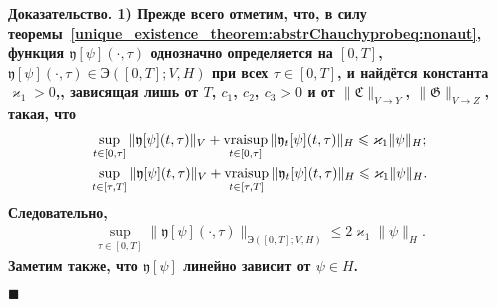 \documentclass{report}
\newcounter{rem}[section]
\newcounter{theor}[section]
\newenvironment{Proof}{\par\noindent\bf Доказательство.\rm}{ $\blacksquare$\par}
\newcommand{\vraisup}{\mathop{\rm vraisup}}
\begin{document}
\begin{Proof}
1) Прежде всего отметим, что, в силу теоремы~\ref{unique_existence_theorem:abstrChauchyprobeq:nonaut}, функция $\mathfrak{y}[\psi](\cdot,\tau)$ 
однозначно определяется на $[0,T]$, $\mathfrak{y}[\psi](\cdot,\tau)\in{\textrm{Э}}([0,T];V,H)$ при всех $\tau\in[0,T]$, и найдётся константа 
$\varkappa_1>0$,, зависящая лишь от $T$, $c_1$, $c_2$, $c_3>0$ и от $\|\mathfrak{C}\|_{V\to Y}$,  $\|\mathfrak{G}\|_{V\to Z}$, такая, что
\begin{gather*}
\sup\limits_{t\in[0,\tau]}\|\mathfrak{y}[\psi](t,\tau)\|_{V}+\vraisup\limits_{t\in[0,\tau]}\|\mathfrak{y}_t[\psi](t,\tau)\|_{H}\leqslant\varkappa_1\|\psi\|_H;\\
\sup\limits_{t\in[\tau,T]}\|\mathfrak{y}[\psi](t,\tau)\|_{V}+\vraisup\limits_{t\in[\tau,T]}\|\mathfrak{y}_t[\psi](t,\tau)\|_{H}\leqslant\varkappa_1\|\psi\|_H.
\end{gather*}
Следовательно,
\begin{gather}\label{abstrChauchyprobeq:nonaut:parametric:homogenious.eq!theorem.y.cont:auxiliary_a_priori_estimate}
\sup\limits_{\tau\in[0,T]}\|\mathfrak{y}[\psi](\cdot,\tau)\|_{\textrm{Э}([0,T];V,H)}\leqslant2\varkappa_1\|\psi\|_H.
\end{gather}
Заметим также, что $\mathfrak{y}[\psi]$ линейно зависит от $\psi\in H$.


\end{Proof}
\end{document}
